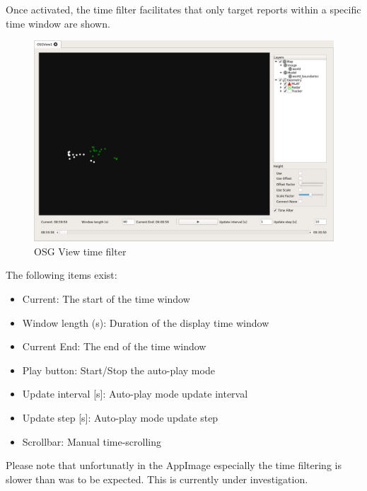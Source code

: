 \documentclass[10pt,letterpaper,extrafontsizes]{memoir}
\begin{document}
{Once activated, the time filter facilitates that only target reports within a specific time window are shown.


\begin{figure}[H]
    \hspace*{-2cm}
    \includegraphics[width=18cm,frame]{../screenshots/osgview_time_filter.png}
  \caption{OSG View time filter}
  \label{fig:osgview_time_filter}
\end{figure}

The following items exist:

\begin{itemize}
 \item Current: The start of the time window
 \item Window length (s): Duration of the display time window
 \item Current End: The end of the time window
 \item Play button: Start/Stop the auto-play mode
 \item Update interval [s]: Auto-play mode update interval
 \item Update step [s]: Auto-play mode update step
 \item Scrollbar: Manual time-scrolling
\end{itemize}

Please note that unfortunatly in the AppImage especially the time filtering is slower than was to be expected. This is currently under investigation.



}
\end{document}
